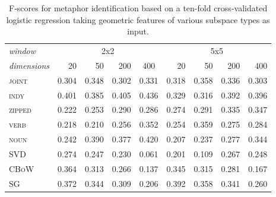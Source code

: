 \begin{table}
\centering
\begin{tabular}{lrrrr|rrrr}
\hline
\emph{window} & \multicolumn{4}{c}{2x2} & \multicolumn{4}{c}{5x5} \\
\emph{dimensions} & 20 & 50 & 200 & \multicolumn{1}{c}{400} & 20 & 50 & 200 & 400 \\
\hline
\textsc{joint} & 0.304 & 0.348 & 0.302 & 0.331 & 0.318 & 0.358 & 0.336 & 0.303 \\
\textsc{indy} & 0.401 & 0.385 & 0.405 & 0.436 & 0.329 & 0.316 & 0.392 & 0.396 \\
\textsc{zipped} & 0.222 & 0.253 & 0.290 & 0.286 & 0.274 & 0.291 & 0.335 & 0.347 \\
\textsc{verb} & 0.218 & 0.210 & 0.256 & 0.352 & 0.254 & 0.359 & 0.275 & 0.284 \\
\textsc{noun} & 0.242 & 0.390 & 0.377 & 0.420 & 0.207 & 0.237 & 0.277 & 0.344 \\
\textsc{SVD} & 0.274 & 0.247 & 0.230 & 0.061 & 0.201 & 0.109 & 0.267 & 0.248 \\
\textsc{CBoW} & 0.364 & 0.313 & 0.266 & 0.137 & 0.345 & 0.315 & 0.281 & 0.167 \\
\textsc{SG} & 0.372 & 0.344 & 0.309 & 0.206 & 0.392 & 0.358 & 0.341 & 0.260 \\
\hline
\end{tabular}
\caption[Context Sensitive and Static Model F-Scores for Metaphor Classification]{F-scores for metaphor identification based on a ten-fold cross-validated logistic regression taking geometric features of various subspace types as input.}
\label{tab:metaphor}
\end{table}

